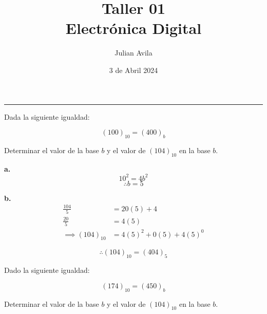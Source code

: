 \documentclass{article}
\title{\textbf{Taller 01\\ \small{Electrónica Digital}}}
\author[1]{Julian Avila}
\affil[1]{20212107030}
\date{3 de Abril 2024}
\newenvironment{problem}[2][Problema]{\begin{trivlist}
\item[\hskip \labelsep {\bfseries #1}\hskip \labelsep {\bfseries #2.}]}{\end{trivlist}}
\newenvironment{solution}[1][Solución]{\begin{trivlist}
\item[\hskip \labelsep {\bfseries #1:}]}{\end{trivlist}}
\begin{document}
\maketitle
\thispagestyle{fancy}
\hrule

\begin{problem}{1}
Dada la siguiente igualdad: 

$$(100)_{10} = (400)_{b}$$

Determinar el valor de la base $b$ y el valor de $(104)_{10}$ en la base $b$.
\end{problem}

\begin{solution}
\textbf{a.}
\begin{equation*}
    10^{2} = 4b^2
\end{equation*}
\begin{equation*}
    \boxed{
        \therefore b = 5
    }
\end{equation*}

\textbf{b.}
\begin{align*}
    \frac{104}{5} & = 20(5) + 4 \\
    \frac{20}{5}  & = 4(5) \\
    \implies (104)_{10}    & = 4(5)^{2} + 0(5) + 4(5)^0
\end{align*}

\begin{equation*}
    \boxed{
        \therefore (104)_{10} = (404)_{5}
    }
\end{equation*}
\end{solution}


\begin{problem}{2}
Dado la siguiente igualdad:

$$ (174)_{10} = (450)_{b} $$

Determinar el valor de la base $b$ y el valor de $(104)_{10}$ en la base $b$.
\end{problem}
\end{document}
